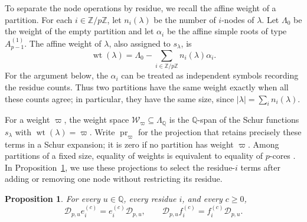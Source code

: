 \documentclass[12pt,reqno,a4paper]{amsart}
\numberwithin{equation}{section}
\numberwithin{figure}{section}
\theoremstyle{plain}
\newtheorem{proposition}[theorem]{Proposition}
\theoremstyle{definition}
\begin{document}
To separate the node operations by residue, we recall the affine
weight of a partition.  For each $i\in\mathbb Z/p\mathbb Z$, let
$n_i(\lambda)$ be the number of $i$-nodes of $\lambda$.  Let
$\Lambda_0$ be the weight of the empty partition and let $\alpha_i$
be the affine simple roots of type $A_{p-1}^{(1)}$.  The affine
weight of $\lambda$, also assigned to $s_\lambda$, is
\begin{equation}\label{eq:fock-affine-weight}
\operatorname{wt}(\lambda)
=\Lambda_0-\sum_{i\in\mathbb Z/p\mathbb Z}n_i(\lambda)\alpha_i.
\end{equation}
For the argument below, the $\alpha_i$ can be treated as independent
symbols recording the residue counts.  Thus two partitions have
the same weight exactly when all these counts agree; in particular,
they have the same size, since $|\lambda|=\sum_i n_i(\lambda)$.

For a weight $\varpi$, the weight space
$\mathcal W_\varpi\subseteq\Lambda_{\mathbb Q}$ is the
$\mathbb Q$-span of the Schur functions $s_\lambda$ with
$\operatorname{wt}(\lambda)=\varpi$.  Write
$\operatorname{pr}_\varpi$ for the projection that retains precisely
these terms in a Schur expansion; it is zero if no partition has
weight $\varpi$.  Among partitions of a fixed size, equality of
weights is equivalent to equality of $p$-cores
\cite[Section~5.3, equation~(8)]{HTY}.
In Proposition~\ref{prop:d-chevalley-commutation}, we use these
projections to select the residue-$i$ terms after adding or removing
one node without restricting its residue.

\begin{proposition}
\label{prop:d-chevalley-commutation}
For every $u\in\mathbb Q$, every residue $i$, and every $c\geq0$,
\begin{equation}\label{eq:d-chevalley-commutation}
\mathcal D_{p,u}e_i^{(c)}=e_i^{(c)}\mathcal D_{p,u},
\qquad
\mathcal D_{p,u}f_i^{(c)}=f_i^{(c)}\mathcal D_{p,u}.
\end{equation}
\end{proposition}
\end{document}
